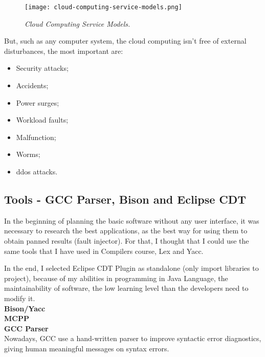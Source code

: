 \begin{figure}[!ht]
\begin{center}
\texttt{[image: cloud-computing-service-models.png]}
\caption{\small \sl Cloud Computing Service Models.\label{fig:cloudcomputingservicemodels}}
\end{center}
\end{figure}

But, such as any computer system, the cloud computing isn't free of external disturbances\cite{wolter2012resilience}, the most important are:
\begin{itemize}
 	\item Security attacks;
 	\item Accidents;
 	\item Power surges;
 	\item Workload faults;
 	\item Malfunction;
 	\item Worms;
 	\item \ac{ddos} attacks.
 \end{itemize}

\clearpage
\subsection{Tools - GCC Parser, Bison and Eclipse CDT}

In the beginning of planning the basic software without any user interface, it was necessary to research the best applications, as the best way for using them to obtain panned results (fault injector).
For that, I thought that I could use the same tools that I have used in Compilers course, Lex and Yacc.


In the end, I selected Eclipse CDT Plugin as standalone (only import libraries to project), because of my abilities in programming in Java Language, the maintainability of software, the low learning level than the developers need to modify it.\\

\textbf{Bison/Yacc}\\

\textbf{MCPP}\\

\textbf{GCC Parser}\\

Nowadays, GCC use a hand-written parser to improve syntactic error diagnostics, giving human meaningful messages on syntax errors.\\

